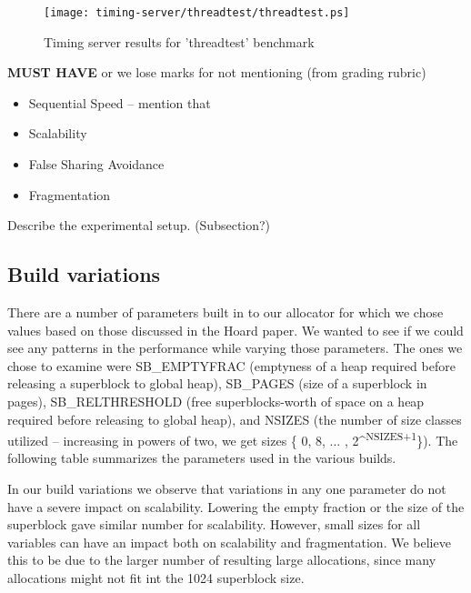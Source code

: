 \documentclass{article}
\begin{document}
\begin{figure}[h]
    \centering
    \texttt{[image: timing-server/threadtest/threadtest.ps]}
    \caption{Timing server results for 'threadtest' benchmark}
    \label{fig:t-threadtest}
\end{figure}

\textbf{MUST HAVE} or we lose marks for not mentioning (from grading rubric)
\begin{itemize}
	\item Sequential Speed -- mention that
	\item Scalability
	\item False Sharing Avoidance
	\item Fragmentation
\end{itemize}

Describe the experimental setup. (Subsection?)

\subsection{Build variations}
There are a number of parameters built in to our allocator for which we chose
values based on those discussed in the Hoard paper. We wanted to see if we
could see any patterns in the performance while varying those parameters. The
ones we chose to examine were SB\_EMPTYFRAC (emptyness of a heap required
before releasing a superblock to global heap), SB\_PAGES (size of a superblock
in pages), SB\_RELTHRESHOLD (free superblocks-worth of space on a heap required
before releasing to global heap), and NSIZES (the number of size classes
utilized -- increasing in powers of two, we get sizes \{ 0, 8, ... ,
2\^{}\textsuperscript{NSIZES+1}\}). The following table summarizes the parameters
used in the various builds.

In our build variations we observe that variations in any one parameter do not 
have a severe impact on scalability. Lowering the empty fraction or the size of 
the superblock gave similar number for scalability. However, small sizes for all
variables can have an impact both on scalability and fragmentation. We believe
this to be due to the larger number of resulting large allocations, since many 
allocations might not fit int the 1024 superblock size.
\end{document}
